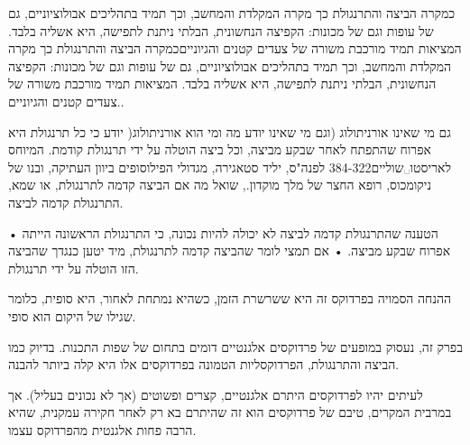 ﻿כמקרה הביצה והתרנגולת כך מקרה המקלדת והמחשב, וכך תמיד בתהליכים אבולוציוניים, גם
של עופות וגם של מכונות: הקפיצה הנחשונית, הבלתי ניתנת לתפישה, היא אשליה בלבד.
המציאות תמיד מורכבת משורה של צעדים קטנים והגיונייםכמקרה הביצה והתרנגולת כך מקרה
המקלדת והמחשב, וכך תמיד בתהליכים אבולוציוניים, גם של עופות וגם של מכונות:
הקפיצה הנחשונית, הבלתי ניתנת לתפישה, היא אשליה בלבד. המציאות תמיד מורכבת משורה
של צעדים קטנים והגיוניים.. 

גם מי שאינו אורניתולוג (וגם מי שאינו יודע מה ומי הוא אורניתולוג( יודע כי כל
תרנגולת היא אפרוח שהתפתח לאחר שבקע מביצה, וכל ביצה הוטלה על ידי תרנגולת קודמת.
 המיוחס
לאריסטו␣שוליים{384-322 לפנה"ס, יליד סטאגירה, מגדולי הפילוסופים ביוון
העתיקה, ובנו של ניקומכוס, רופא החצר של מלך מוקדון.}, שואל מה אם הביצה קדמה
לתרנגולת, או שמא, התרנגולת קדמה לביצה.
\begin{itemize}

• הטענה שהתרנגולת קדמה לביצה לא יכולה להיות נכונה, כי התרנגולת הראשונה הייתה אפרוח שבקע מביצה.
• אם תמצי לומר שהביצה קדמה לתרנגולת, מיד יטען כנגדך שהביצה הזו הוטלה על ידי תרנגולת.

ההנחה הסמויה בפרדוקס זה היא ששרשרת הזמן, כשהיא נמתחת לאחור, היא סופית, כלומר
שגילו של היקום הוא סופי.

\end{itemize}
בפרק זה, נעסוק במופעים של פרדוקסים אלגנטיים דומים בתחום של שפות התכנות. בדיוק כמו הביצה והתרנגולת, הפרדוקסליות הטמונה בפרדוקסים אלו היא קלה ביותר להבנה.

לעיתים יהיו לפרדוקסים היתרם אלגנטיים, קצרים ופשוטים (אך לא נכונים בעליל). אך במרבית המקרים, טיבם של פרדוקסים הוא זה שהיתרם בא רק לאחר חקירה עמקנית, שהיא הרבה פחות אלגנטית מהפרדוקס עצמו.

